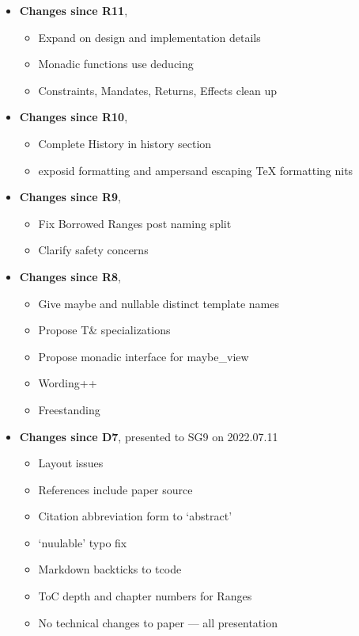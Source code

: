 \documentclass[a4paper,10pt,oneside,openany,final,article]{memoir}
\begin{document}
\begin{itemize}
\item \textbf{Changes since R11},
  \begin{itemize}
  \item Expand on design and implementation details
  \item Monadic functions use deducing 
  \item Constraints, Mandates, Returns, Effects clean up
  \end{itemize}
\item \textbf{Changes since R10},
  \begin{itemize}
  \item Complete History in history section
  \item exposid formatting and ampersand escaping TeX formatting nits
  \end{itemize}
\item \textbf{Changes since R9},
  \begin{itemize}
  \item Fix Borrowed Ranges post naming split
  \item Clarify safety concerns
  \end{itemize}
\item \textbf{Changes since R8},
  \begin{itemize}
  \item Give maybe and nullable distinct template names
  \item Propose T\& specializations
  \item Propose monadic interface for maybe_view
  \item Wording++
  \item Freestanding
  \end{itemize}
\item \textbf{Changes since D7}, presented to SG9 on 2022.07.11
  \begin{itemize}
  \item Layout issues
  \item References include paper source
  \item Citation abbreviation form to `abstract'
  \item `nuulable' typo fix
  \item Markdown backticks to tcode
  \item ToC depth and chapter numbers for Ranges
  \item No technical changes to paper --- all presentation
  \end{itemize}

\end{itemize}
\end{document}
